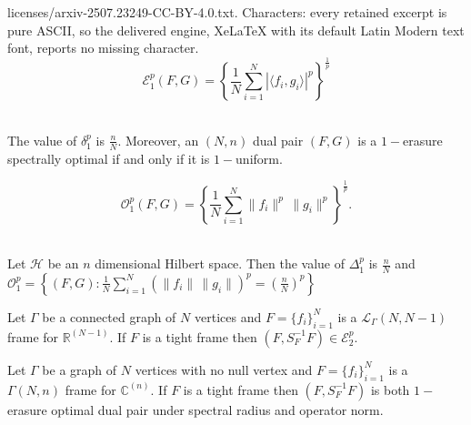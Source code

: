 \documentclass[10pt,a4paper]{amsart}
\begin{document}
licenses/arxiv-2507.23249-CC-BY-4.0.txt. Characters: every retained excerpt is pure ASCII, so the delivered engine, XeLaTeX with its default Latin Modern text font, reports no missing character.
	\begin{equation}\label{equation2}
		\mathcal{E}_{1}^p (F,G) = \left\{\frac{1}{N} \sum\limits_{i=1}^N \left|\langle f_i, g_i \rangle \right|^p\right\}^{\frac{1}{p}}
	\end{equation}\\

	\begin{prop}\label{prop3point1}
		The  value of $ \delta_{1}^p$ is $\frac{n}{N}$. Moreover, an $(N,n)$ dual pair $(F,G) $ is a $1-$erasure spectrally optimal  if and only if it is $1-$uniform.
	\end{prop}

\begin{equation}\label{equation6}
	\mathcal{O}_{1}^p (F,G) = \left\{\frac{1}{N} \sum \limits_{i=1}^N\|f_i\|^p\,\| g_i \| ^p\right\}^{\frac{1}{p}}.
\end{equation}\\

	\begin{prop}\label{prop4point1}
	Let $\mathcal{H}$ be an $n$ dimensional Hilbert space. Then the  value of $ \Delta_{1}^p$ is $\frac{n}{N}$ and  $ \mathcal{O}_{1}^p = \left\{(F,G): \frac{1}{N} \sum\limits_{i=1}^N \left(\|f_i\|\,\| g_i \| \right)^p =  \left(  \frac{n}{N}  \right)^p \right\}$ 
\end{prop}

\begin{thm} \label{thm5point2}
	Let $\Gamma$ be a connected graph of $N$ vertices and $F= \{f_i\}_{i=1}^N$ is a $\mathcal{L}_{\Gamma}(N,N-1)$ frame for $\mathbb{R}^{(N-1)}.$ If $F$ is a  tight frame then $\left( F, S_{F}^{-1}F \right) \in 	\mathcal{E}_{2}^p .$
\end{thm}

\begin{thm}
	Let $\Gamma$ be a graph of $N$ vertices with no null vertex and $F= \{f_i\}_{i=1}^N$ is a $\Gamma(N,n)$ frame for $\mathbb{C}^{(n)}.$ If $F$ is a  tight frame then $\left( F, S_{F}^{-1}F \right) $ is both $1-$erasure optimal dual pair under spectral radius and operator norm. 
\end{thm}
\end{document}
